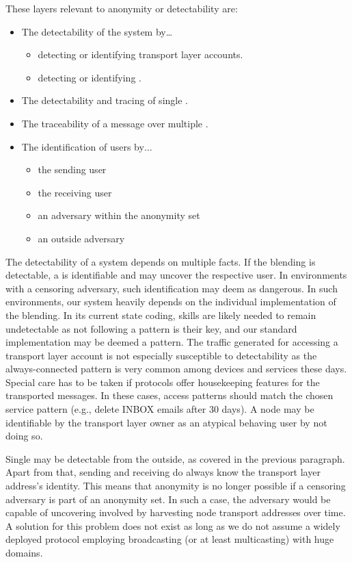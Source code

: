 These layers relevant to anonymity or detectability are:
\begin{itemize}
	\item The detectability of the system by\ldots
	\begin{itemize}
		\item detecting or identifying transport layer accounts.
		\item detecting or identifying \VortexNodes{}.
	\end{itemize}
	\item The detectability and tracing of single \VortexMessages.
	\item The traceability of a message over multiple \VortexNodes{}.
	\item The identification of \MessageVortex{} users by$\ldots$
	\begin{itemize}
		\item the sending \MessageVortex{} user
		\item the receiving \MessageVortex{} user
		\item an adversary within the anonymity set
		\item an outside adversary
	\end{itemize}
\end{itemize} 

The detectability of a system depends on multiple facts. If the blending is detectable, a \VortexNode{} is identifiable and may uncover the respective user. In environments with a censoring adversary, such identification may deem as dangerous. In such environments, our system heavily depends on the individual implementation of the blending. In its current state coding, skills are likely needed to remain undetectable as not following a pattern is their key, and our standard implementation may be deemed a pattern. The traffic generated for accessing a transport layer account is not especially susceptible to detectability as the always-connected pattern is very common among devices and services these days. Special care has to be taken if protocols offer housekeeping features for the transported messages. In these cases, access patterns should match the chosen service pattern (e.g., delete INBOX emails after 30 days). A node may be identifiable by the transport layer owner as an atypical behaving user by not doing so.

Single \VortexMessages{} may be detectable from the outside, as covered in the previous paragraph. Apart from that, sending and receiving \VortexNodes{} do always know the transport layer address's identity. This means that anonymity is no longer possible if a censoring adversary is part of an anonymity set. In such a case, the adversary would be capable of uncovering involved \VortexNodes{} by harvesting node transport addresses over time. A solution for this problem does not exist as long as we do not assume a widely deployed protocol employing broadcasting (or at least multicasting) with huge domains.

